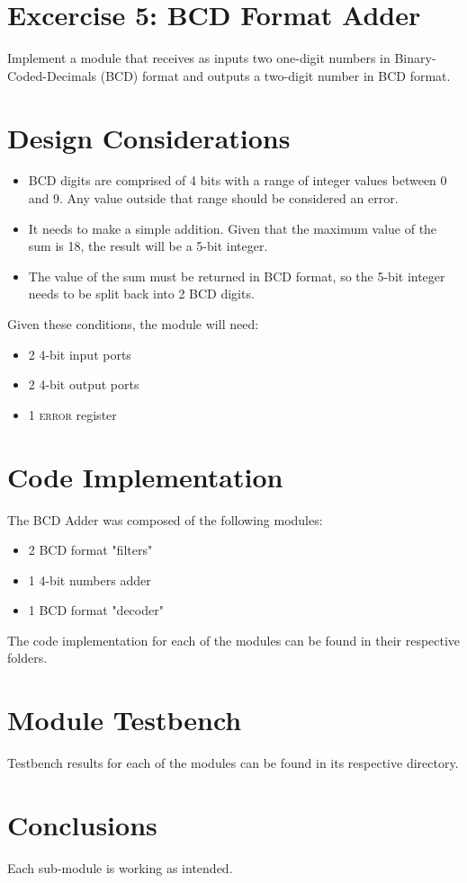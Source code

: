 \documentclass[a4paper,10pt]{article}
\begin{document}
\section {Excercise 5: BCD Format Adder}
Implement a module that receives as inputs two one-digit numbers in Binary-Coded-Decimals (BCD) format and outputs a two-digit number in BCD format.

\section{Design Considerations}
\begin{itemize}
\item BCD digits are comprised of 4 bits with a range of integer values between 0 and 9. Any value outside that range should be considered an error.
\item It needs to make a simple addition. Given that the maximum value of the sum is 18, the result will be a 5-bit integer.
\item The value of the sum must be returned in BCD format, so the 5-bit integer needs to be split back into 2 BCD digits.
\end{itemize}

Given these conditions, the module will need: 
\begin{itemize}
\item 2 4-bit input ports
\item 2 4-bit output ports
\item 1 \textsc{error} register
\end{itemize}

\section{Code Implementation}
The BCD Adder was composed of the following modules:
\begin{itemize}
\item 2 BCD format "filters"
\item 1 4-bit numbers adder
\item 1 BCD format "decoder"
\end{itemize}

The code implementation for each of the modules can be found in their respective folders.

\section{Module Testbench}
Testbench results for each of the modules can be found in its respective directory.

\section{Conclusions}
Each sub-module is working as intended.
\end{document}

